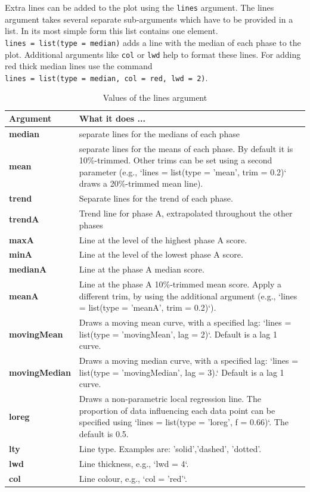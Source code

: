 \documentclass[
]{book}
\begin{document}
Extra lines can be added to the plot using the \texttt{lines} argument. The lines argument takes several separate sub-arguments which have to be provided in a list. In its most simple form this list contains one element. \texttt{lines\ =\ list(type\ =\ \textquotesingle{}median\textquotesingle{})} adds a line with the median of each phase to the plot. Additional arguments like \texttt{col} or \texttt{lwd} help to format these lines. For adding red thick median lines use the command \texttt{lines\ =\ list(type\ =\ \textquotesingle{}median\textquotesingle{},\ col\ =\ \textquotesingle{}red\textquotesingle{},\ lwd\ =\ \textquotesingle{}2\textquotesingle{})}.

\begin{table}

\caption{\label{tab:table-lines-arguments}Values of the lines argument}
\begin{tabular}[t]{>{\raggedright\arraybackslash}p{15em}>{\raggedright\arraybackslash}p{30em}}
\toprule
Argument & What it does ...\\
\midrule
\textbf{median} & separate lines for the medians of each phase\\
\textbf{mean} & separate lines for the means of each phase. By default it is 10\%-trimmed. Other trims can be set using a second parameter (e.g., `lines = list(type = 'mean', trim = 0.2)` draws a 20\%-trimmed mean line).\\
\textbf{trend} & Separate lines for the trend of each phase.\\
\textbf{trendA} & Trend line for phase A, extrapolated throughout the other phases\\
\textbf{maxA} & Line at the level of the highest phase A score.\\
\textbf{minA} & Line at the level of the lowest phase A score.\\
\textbf{medianA} & Line at the phase A median score.\\
\textbf{meanA} & Line at the phase A 10\%-trimmed mean score. Apply a different trim, by using the additional argument (e.g., `lines = list(type = 'meanA', trim = 0.2)`).\\
\textbf{movingMean} & Draws a moving mean curve, with a specified lag: `lines = list(type = 'movingMean', lag = 2)`. Default is a lag 1 curve.\\
\textbf{movingMedian} & Draws a moving median curve, with a specified lag: `lines = list(type = 'movingMedian', lag = 3).` Default is a lag 1 curve.\\
\textbf{loreg} & Draws a non-parametric local regression line. The proportion of data influencing each data point can be specified using `lines = list(type = 'loreg', f = 0.66)`. The default is 0.5.\\
\textbf{lty} & Line type. Examples are: 'solid','dashed', 'dotted'.\\
\textbf{lwd} & Line thickness, e.g., `lwd = 4`.\\
\textbf{col} & Line colour, e.g., `col = 'red'`.\\
\bottomrule
\end{tabular}
\end{table}
\end{document}
